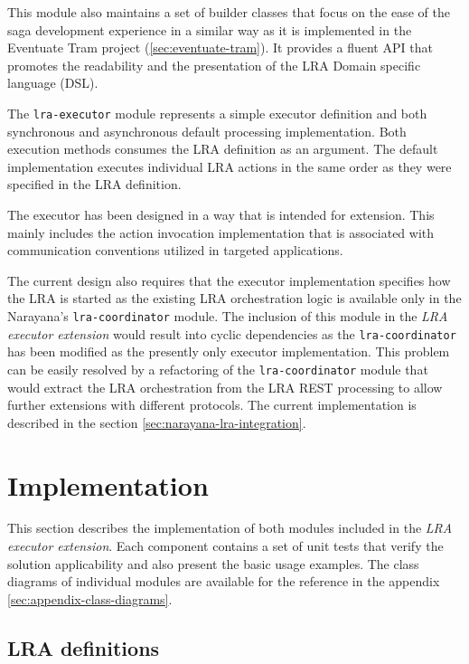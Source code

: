 \documentclass[oneside,
  digital, %
  table,   %
  lof,     %
  lot,     %
]{fithesis3}
\begin{document}
This module also maintains a set of builder classes that focus on the ease of the saga development experience in a similar way as it is implemented in the Eventuate Tram project (\ref{sec:eventuate-tram}). It provides a fluent API that promotes the readability and the presentation of the LRA Domain specific language (DSL).  

The \texttt{lra-executor} module represents a simple executor definition and both synchronous and asynchronous default processing implementation. Both execution methods consumes the LRA definition as an argument. The default implementation executes individual LRA actions in the same order as they were specified in the LRA definition.

The executor has been designed in a way that is intended for extension. This mainly includes the action invocation implementation that is associated with communication conventions utilized in targeted applications. 

The current design also requires that the executor implementation specifies how the LRA is started as the existing LRA orchestration logic is available only in the Narayana's \texttt{lra-coordinator} module. The inclusion of this module in the \textit{LRA executor extension} would result into cyclic dependencies as the \texttt{lra-coordinator} has been modified as the presently only executor implementation. This problem can be easily resolved by a refactoring of the \texttt{lra-coordinator} module that would extract the LRA orchestration from the LRA REST processing to allow further extensions with different protocols. The current implementation is described in the section \ref{sec:narayana-lra-integration}.


\section{Implementation}

This section describes the implementation of both modules included in the \textit{LRA executor extension}. Each component contains a set of unit tests that verify the solution applicability and also present the basic usage examples. The class diagrams of individual modules are available for the reference in the appendix \ref{sec:appendix-class-diagrams}.

\subsection{LRA definitions}
\end{document}
